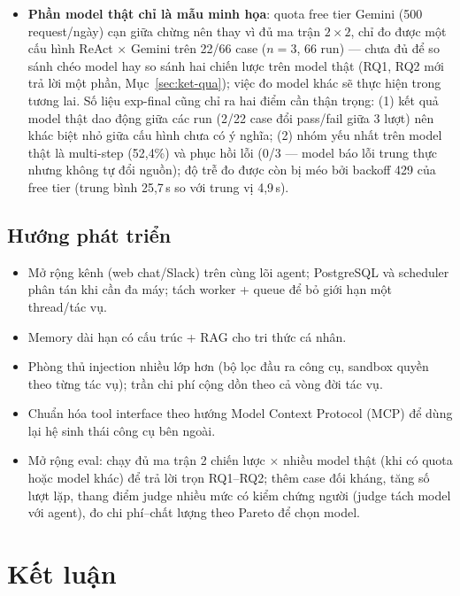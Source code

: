 \begin{itemize}
        Bộ 66 case chưa phủ hết không gian hành vi.
  \item \textbf{Phần model thật chỉ là mẫu minh họa}: quota free tier Gemini
        (500 request/ngày) cạn giữa chừng nên thay vì đủ ma trận
        $2 \times 2$, chỉ đo được một cấu hình ReAct $\times$ Gemini trên
        22/66 case ($n=3$, 66 run) --- chưa đủ để so sánh chéo model hay so
        sánh hai chiến lược trên model thật (RQ1, RQ2 mới trả lời một
        phần, Mục~\ref{sec:ket-qua}); việc đo model khác sẽ thực hiện trong
        tương lai. Số liệu exp-final cũng chỉ ra hai điểm cần thận trọng:
        (1) kết quả model thật dao động giữa các run (2/22 case đổi
        pass/fail giữa 3 lượt) nên khác biệt nhỏ giữa cấu hình chưa có ý
        nghĩa; (2) nhóm yếu nhất trên model thật là multi-step
        (52{,}4\%) và phục hồi lỗi (0/3 --- model báo lỗi trung thực nhưng
        không tự đổi nguồn); độ trễ đo được còn bị méo bởi backoff 429 của
        free tier (trung bình 25{,}7\,s so với trung vị 4{,}9\,s).
\end{itemize}

\subsection{Hướng phát triển}

\begin{itemize}
  \item Mở rộng kênh (web chat/Slack) trên cùng lõi agent; PostgreSQL và
        scheduler phân tán khi cần đa máy; tách worker + queue để bỏ giới hạn
        một thread/tác vụ.
  \item Memory dài hạn có cấu trúc + RAG cho tri thức cá nhân.
  \item Phòng thủ injection nhiều lớp hơn (bộ lọc đầu ra công cụ, sandbox
        quyền theo từng tác vụ); trần chi phí cộng dồn theo cả vòng đời tác
        vụ.
  \item Chuẩn hóa tool interface theo hướng Model Context Protocol (MCP) để
        dùng lại hệ sinh thái công cụ bên ngoài.
  \item Mở rộng eval: chạy đủ ma trận 2 chiến lược $\times$ nhiều model thật
        (khi có quota hoặc model khác) để trả lời trọn RQ1--RQ2; thêm case
        đối kháng, tăng số lượt lặp, thang điểm judge nhiều mức có kiểm
        chứng người (judge tách model với agent), đo chi phí--chất lượng
        theo Pareto để chọn model.
\end{itemize}

\section*{Kết luận}

